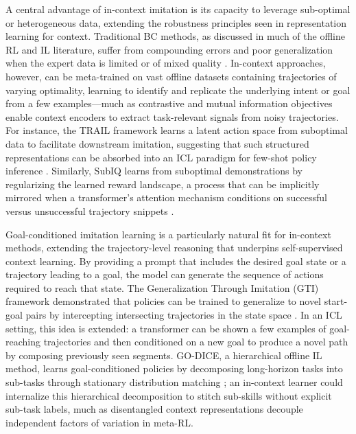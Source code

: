 \documentclass[11pt]{article}
\begin{document}
A central advantage of in-context imitation is its capacity to leverage sub-optimal or heterogeneous data, extending the robustness principles seen in representation learning for context. Traditional BC methods, as discussed in much of the offline RL and IL literature, suffer from compounding errors and poor generalization when the expert data is limited or of mixed quality \cite{ref347,ref348}. In-context approaches, however, can be meta-trained on vast offline datasets containing trajectories of varying optimality, learning to identify and replicate the underlying intent or goal from a few examples---much as contrastive and mutual information objectives enable context encoders to extract task-relevant signals from noisy trajectories. For instance, the TRAIL framework learns a latent action space from suboptimal data to facilitate downstream imitation, suggesting that such structured representations can be absorbed into an ICL paradigm for few-shot policy inference \cite{ref349}. Similarly, SubIQ learns from suboptimal demonstrations by regularizing the learned reward landscape, a process that can be implicitly mirrored when a transformer's attention mechanism conditions on successful versus unsuccessful trajectory snippets \cite{ref350}.

Goal-conditioned imitation learning is a particularly natural fit for in-context methods, extending the trajectory-level reasoning that underpins self-supervised context learning. By providing a prompt that includes the desired goal state or a trajectory leading to a goal, the model can generate the sequence of actions required to reach that state. The Generalization Through Imitation (GTI) framework demonstrated that policies can be trained to generalize to novel start-goal pairs by intercepting intersecting trajectories in the state space \cite{ref351}. In an ICL setting, this idea is extended: a transformer can be shown a few examples of goal-reaching trajectories and then conditioned on a new goal to produce a novel path by composing previously seen segments. GO-DICE, a hierarchical offline IL method, learns goal-conditioned policies by decomposing long-horizon tasks into sub-tasks through stationary distribution matching \cite{ref352}; an in-context learner could internalize this hierarchical decomposition to stitch sub-skills without explicit sub-task labels, much as disentangled context representations decouple independent factors of variation in meta-RL.
\end{document}
